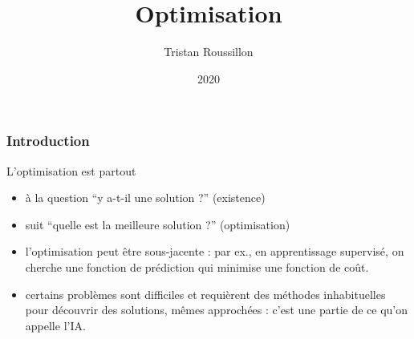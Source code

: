 \documentclass{beamer}
\title[]
 {Optimisation}
\author[T. Roussillon]
 {Tristan Roussillon}
\date{2020}
\institute{INSA Lyon, TC}
\begin{document}
\begin{frame}
  \titlepage
\end{frame}

\begin{frame}
  \frametitle{Introduction}

  \begin{block}{L'optimisation est partout}
  \begin{itemize}
  \item à la question ``y a-t-il une solution ?'' (existence)
  \item suit ``quelle est la meilleure solution ?'' (optimisation)
  \item l'optimisation peut être sous-jacente : par ex., en apprentissage supervisé, on cherche
    une fonction de prédiction qui minimise une fonction de coût.
  \item certains problèmes sont difficiles et requièrent des méthodes inhabituelles pour découvrir
    des solutions, mêmes approchées : c'est une partie de ce qu'on appelle l'IA.
  \end{itemize}
  \end{block}
  
\end{frame}
\end{document}
